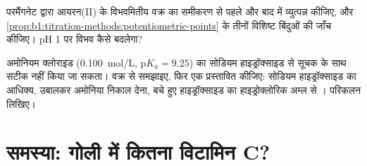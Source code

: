 \begin{exercise}[$\star\star\star$]\label{exo:b1:titration-methods:11}
परमैंगनेट द्वारा आयरन(II) के विभवमितीय वक्र का समीकरण
 से पहले और बाद में व्युत्पन्न कीजिए, और \cref{prop:b1:titration-methods:potentiometric-points} के
तीनों विशिष्ट बिंदुओं की जाँच कीजिए।
pH 1 पर  विभव कैसे बदलेगा?
\end{exercise}

\begin{exercise}[$\star\star\star$]\label{exo:b1:titration-methods:12}
अमोनियम क्लोराइड (\qty{0.100}{mol/L}, $\mathrm{p}K_a = 9.25$) का
सोडियम हाइड्रॉक्साइड से सूचक के साथ सटीक  नहीं किया जा सकता। वक्र से
समझाइए, फिर एक  प्रस्तावित कीजिए: सोडियम हाइड्रॉक्साइड का आधिक्य, उबालकर
अमोनिया निकाल देना, बचे हुए हाइड्रॉक्साइड का हाइड्रोक्लोरिक अम्ल से ।
परिकलन लिखिए।
\end{exercise}
\clearpage\enlargethispage{3\baselineskip}
\section{समस्या: गोली में कितना विटामिन C?}

